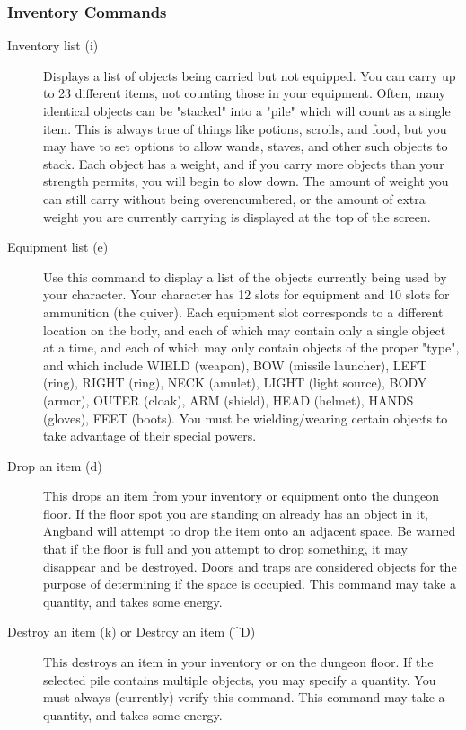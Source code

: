 \subsubsection{Inventory Commands} \begin{description} \item[Inventory
        list (i)] Displays a list of objects being carried but not
        equipped. You can carry up to 23 different items, not counting
        those in your equipment. Often, many identical objects can be
        "stacked" into a "pile" which will count as a single item. This
        is always true of things like potions, scrolls, and food, but
        you may have to set options to allow wands, staves, and other
        such objects to stack. Each object has a weight, and if you
        carry more objects than your strength permits, you will begin to
        slow down. The amount of weight you can still carry without
        being overencumbered, or the amount of extra weight you are
        currently carrying is displayed at the top of the screen.
 
\item[Equipment list (e)] Use this command to display a list of the
    objects currently being used by your character. Your character has
    12 slots for equipment and 10 slots for ammunition (the quiver).
    Each equipment slot corresponds to a different location on the body,
    and each of which may contain only a single object at a time, and
    each of which may only contain objects of the proper "type", and
    which include WIELD (weapon), BOW (missile launcher), LEFT (ring),
    RIGHT (ring), NECK (amulet), LIGHT (light source), BODY (armor),
    OUTER (cloak), ARM (shield), HEAD (helmet), HANDS (gloves), FEET
    (boots). You must be wielding/wearing certain objects to take
    advantage of their special powers.

\item[Drop an item (d)] This drops an item from your inventory or
    equipment onto the dungeon floor. If the floor spot you are standing
    on already has an object in it, Angband will attempt to drop the
    item onto an adjacent space. Be warned that if the floor is full and
    you attempt to drop something, it may disappear and be destroyed.
    Doors and traps are considered objects for the purpose of
    determining if the space is occupied. This command may take a
    quantity, and takes some energy.

\item[Destroy an item (k) or Destroy an item (\^{}D)] This destroys an item
    in your inventory or on the dungeon floor.  If the selected pile
    contains multiple objects, you may specify a quantity. You must
    always (currently) verify this command. This command may take a
    quantity, and takes some energy.


\end{description}
